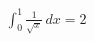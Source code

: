 \documentclass[preview]{standalone}
\begin{document}
\begin{align*}
\int_{0}^{1} \frac{1}{\sqrt{x}} \, dx = 2
\end{align*}
\end{document}
